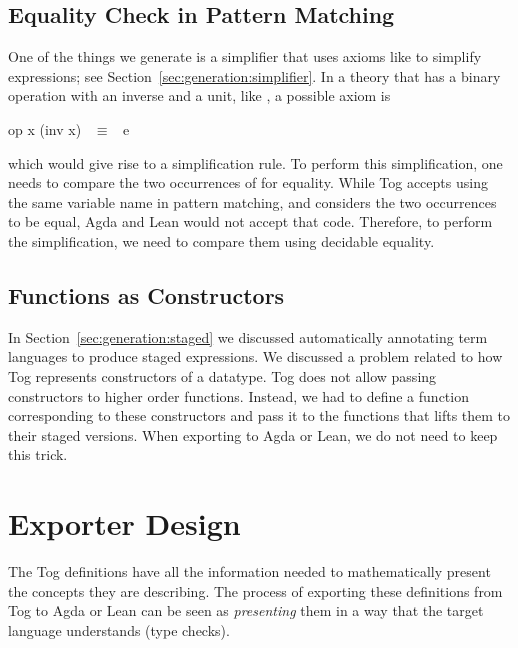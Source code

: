 \subsection{Equality Check in Pattern Matching}
One of the things we generate is a simplifier that uses axioms like  to simplify expressions; see Section~\ref{sec:generation:simplifier}. 
In a theory that has a binary operation with an inverse and a unit, like , a possible axiom is  
\begin{agdacode}
op x (inv x) ~$\equiv$~ e 
\end{agdacode}
\noindent which would give rise to a simplification rule. To perform this simplification, one needs to compare the two occurrences of  for equality. While Tog accepts using the same variable name in pattern matching, and considers the two occurrences to be equal, Agda and Lean would not accept that code. Therefore, to perform the simplification, we need to compare them using decidable equality.

\subsection{Functions as Constructors}
In Section~\ref{sec:generation:staged} we discussed automatically annotating term languages to produce staged expressions. We discussed a problem related to how Tog represents constructors of a datatype. Tog does not allow passing constructors to higher order functions. Instead, we had to define a function corresponding to these constructors and pass it to the functions that lifts them to their staged versions. When exporting to Agda or Lean, we do not need to keep this trick.

\section{Exporter Design}
\label{sec:export_design}
The Tog definitions have all the information needed to mathematically present the concepts they are describing. The process of exporting these definitions from Tog to Agda or Lean can be seen as \emph{presenting} them in a way that the target language understands (type checks).

